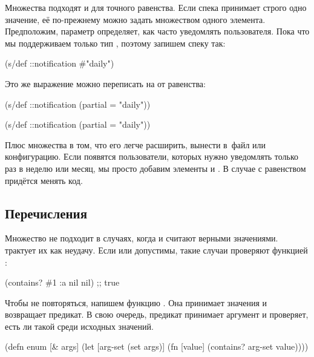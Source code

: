 Множества подходят и для точного равенства. Если спека принимает строго одно
значение, её по-прежнему можно задать множеством одного
элемента. Предположим, параметр  определяет, как часто уведомлять
пользователя. Пока что мы поддерживаем только тип , поэтому
запишем спеку так:

\begin{clojure}
(s/def ::notification #{"daily"})
\end{clojure}

\noindent
Это же выражение можно переписать на  от равенства:

\ifnarrow

\begin{clojure}
(s/def ::notification
  (partial = "daily"))
\end{clojure}

\else

\begin{clojure}
(s/def ::notification (partial = "daily"))
\end{clojure}

\fi

Плюс множества в том, что его легче расширить, вынести в~файл или
конфигурацию. Если появятся пользователи, которых нужно уведомлять только раз в
неделю или месяц, мы просто добавим элементы  и . В
случае с равенством придётся менять код.

\subsection{Перечисления}


Множество не подходит в случаях, когда  и  считают верными
значениями.  трактует их как неудачу. Если  или
 допустимы, такие случаи проверяют функцией :

\begin{clojure}
(contains? #{1 :a nil} nil) ;; true
\end{clojure}

Чтобы не повторяться, напишем функцию . Она принимает значения и
возвращает предикат. В свою очередь, предикат принимает аргумент и проверяет,
есть ли такой среди исходных значений.

\begin{clojure}
(defn enum [& args]
  (let [arg-set (set args)]
    (fn [value]
      (contains? arg-set value))))
\end{clojure}

